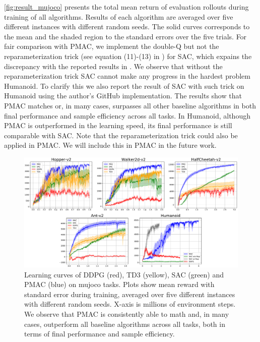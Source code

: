 \cref{fig:result_mujoco} presents the total mean return of evaluation rollouts during training of all algorithms. Results of each algorithm are averaged over five different instances with different random seeds. The solid curves corresponds to the mean and the shaded region to the standard errors over the five trials. For fair comparison with PMAC, we implement the double-Q but not the reparameterization trick (see equation (11)-(13) in \citep{haarnoja2018soft}) for SAC, which expains the discrepancy with the reported results in \citep{haarnoja2018soft}. We observe that without the reparameterization trick SAC cannot make any progress in the hardest problem Humanoid. To clarify this we also report the result of SAC with such trick on Humanoid using the author's GitHub implementation. The results show that PMAC matches or, in many cases, surpasses all other baseline algorithms in both final performance and sample efficiency across all tasks. In Humanoid, although PMAC is outperformed in the learning speed, its final performance is still comparable with SAC. Note that the reparameterization trick could also be applied in PMAC. We will include this in PMAC in the future work.

\begin{figure}[t]
\begin{center}
\includegraphics[width=0.85\linewidth]{./mujoco-results.pdf}
\end{center}
\caption{
Learning curves of DDPG (red), TD3 (yellow), SAC (green) and PMAC (blue) on mujoco tasks. Plots show mean reward with standard error during training, averaged over five different instances with different random seeds. X-axis is millions of environment steps. We observe that PMAC is consistently able to math and, in many cases, outperform all baseline algorithms across all tasks, both in terms of final performance and sample efficiency. }
\label{fig:result_mujoco } 
\end{figure}


